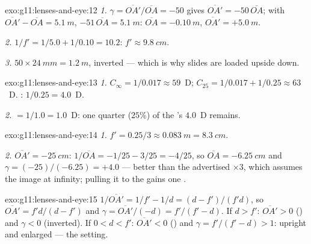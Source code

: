 \begin{solution}{exo:g11:lenses-and-eye:12}
\emph{1.} $\gamma = \overline{OA'}/\overline{OA} = -50$ gives
$\overline{OA'} = -50\,\overline{OA}$; with
$\overline{OA'} - \overline{OA} = \qty{5.1}{m}$,
$-51\,\overline{OA} = \qty{5.1}{m}$: $\overline{OA} = \qty{-0.10}{m}$,
$\overline{OA'} = +\qty{5.0}{m}$.

\emph{2.} $1/f' = 1/5.0 + 1/0.10 = 10.2$: $f' \approx \qty{9.8}{cm}$.

\emph{3.} $50 \times \qty{24}{mm} = \qty{1.2}{m}$, inverted --- which
is why slides are loaded upside down.
\end{solution}

\begin{solution}{exo:g11:lenses-and-eye:13}
\emph{1.} $C_\infty = 1/0.017 \approx 59$~D;
$C_{25} = 1/0.017 + 1/0.25 \approx 63$~D. :
$1/0.25 = 4.0$~D.

\emph{2.}  $= 1/1.0 = 1.0$~D: one quarter ($25\%$) of the
's $4.0$~D remains.
\end{solution}

\begin{solution}{exo:g11:lenses-and-eye:14}
\emph{1.} $f' = 0.25/3 \approx \qty{0.083}{m} = \qty{8.3}{cm}$.

\emph{2.} $\overline{OA'} = \qty{-25}{cm}$:
$1/\overline{OA} = -1/25 - 3/25 = -4/25$, so
$\overline{OA} = \qty{-6.25}{cm}$ and
$\gamma = (-25)/(-6.25) = +4.0$ --- better than the advertised
$\times 3$, which assumes the image at infinity; pulling it to the
 gains one .
\end{solution}

\begin{solution}{exo:g11:lenses-and-eye:15}
$1/\overline{OA'} = 1/f' - 1/d = (d - f')/(f'd)$, so
$\overline{OA'} = f'd/(d - f')$ and
$\gamma = \overline{OA'}/(-d) = f'/(f' - d)$. If $d > f'$:
$\overline{OA'} > 0$ () and $\gamma < 0$ (inverted). If
$0 < d < f'$: $\overline{OA'} < 0$ () and
$\gamma = f'/(f' - d) > 1$: upright and enlarged --- the 
setting.
\end{solution}

